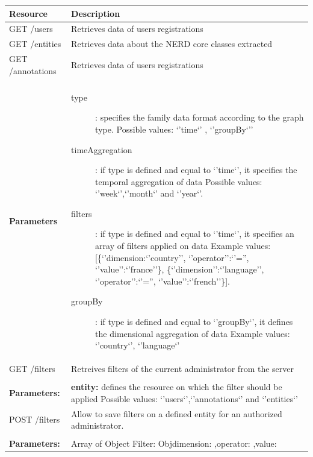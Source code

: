 \documentclass[a4paper,13pt]{report}
\begin{document}
        \begin{tabular}[ht]{p{3cm}|p{10cm}}
          Resource & Description \\
          \hline
          GET  /users & Retrieves data of users registrations \\
          GET  /entities & Retrieves data about the NERD core classes extracted \\
          GET  /annotations & Retrieves data of users registrations \\
          \\
          \textbf{Parameters} &

            \begin{description}
            \item [type]: specifies the family data format according to the graph type.\newline
                        Possible values: `'time`' , `'groupBy`''\newline
            \item [timeAggregation]: if type is defined and equal to `'time`', it specifies the temporal aggregation of data \newline
            Possible values:  `'week`',`'month`' and `'year`'.\newline

            \item [filters]: if type is defined and equal to `'time`', it specifies an array of filters applied on data \newline
            Example values: [\{`'dimension:`'country'', `'operator'':`'='', `'value'':`'france''\}, \{`'dimension'':`'language'', `'operator'':`'='', `'value'':`'french''\}].\newline


            \item [groupBy]: if type is defined and equal to `'groupBy`', it defines  the dimensional aggregation of data\newline
            Example values: `'country`', `'language`'

            \end{description}
 
             \\
            
        \hline
        GET /filters & Retreives filters of the current administrator from the server \\\\
        \textbf{Parameters:} & \textbf{entity:} defines the resource on which the filter should be applied\newline
        Possible values: `'users`',`'annotations`' and `'entities`'
        \\
        \hline
        POST /filters & Allow to save filters on a defined entity for an authorized administrator.\\ \\
         \textbf{Parameters:} & Array of Object Filter: Obj{dimension: ,operator: ,value:}


        \end{tabular}
\end{document}
